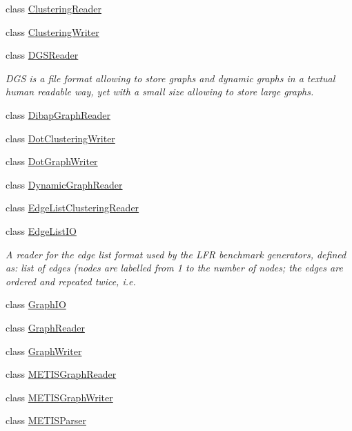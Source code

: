 \begin{DoxyCompactItemize}
\item 
class \hyperlink{class_networ_kit_1_1_clustering_reader}{Clustering\-Reader}
\item 
class \hyperlink{class_networ_kit_1_1_clustering_writer}{Clustering\-Writer}
\item 
class \hyperlink{class_networ_kit_1_1_d_g_s_reader}{D\-G\-S\-Reader}
\begin{DoxyCompactList}\small\item\em D\-G\-S is a file format allowing to store graphs and dynamic graphs in a textual human readable way, yet with a small size allowing to store large graphs. \end{DoxyCompactList}\item 
class \hyperlink{class_networ_kit_1_1_dibap_graph_reader}{Dibap\-Graph\-Reader}
\item 
class \hyperlink{class_networ_kit_1_1_dot_clustering_writer}{Dot\-Clustering\-Writer}
\item 
class \hyperlink{class_networ_kit_1_1_dot_graph_writer}{Dot\-Graph\-Writer}
\item 
class \hyperlink{class_networ_kit_1_1_dynamic_graph_reader}{Dynamic\-Graph\-Reader}
\item 
class \hyperlink{class_networ_kit_1_1_edge_list_clustering_reader}{Edge\-List\-Clustering\-Reader}
\item 
class \hyperlink{class_networ_kit_1_1_edge_list_i_o}{Edge\-List\-I\-O}
\begin{DoxyCompactList}\small\item\em A reader for the edge list format used by the L\-F\-R benchmark generators, defined as\-: list of edges (nodes are labelled from 1 to the number of nodes; the edges are ordered and repeated twice, i.\-e. \end{DoxyCompactList}\item 
class \hyperlink{class_networ_kit_1_1_graph_i_o}{Graph\-I\-O}
\item 
class \hyperlink{class_networ_kit_1_1_graph_reader}{Graph\-Reader}
\item 
class \hyperlink{class_networ_kit_1_1_graph_writer}{Graph\-Writer}
\item 
class \hyperlink{class_networ_kit_1_1_m_e_t_i_s_graph_reader}{M\-E\-T\-I\-S\-Graph\-Reader}
\item 
class \hyperlink{class_networ_kit_1_1_m_e_t_i_s_graph_writer}{M\-E\-T\-I\-S\-Graph\-Writer}
\item 
class \hyperlink{class_networ_kit_1_1_m_e_t_i_s_parser}{M\-E\-T\-I\-S\-Parser}

\end{DoxyCompactItemize}
